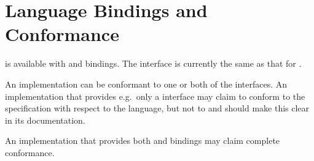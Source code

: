 \section{Language Bindings and Conformance}

\openshmem is available with \Clang{} and \Fortran{} bindings.  The \Cpp{}
interface is currently the same as that for \Clang.

An \openshmem implementation can be conformant to one or both of the
interfaces.  An implementation that provides e.g.\ only a \Clang{} interface
may claim to conform to the \openshmem specification with respect to
the \Clang{} language, but not to \Fortran{} and should make this clear in its
documentation.

An implementation that provides both \Clang{} and \Fortran{} bindings may claim
complete conformance.
